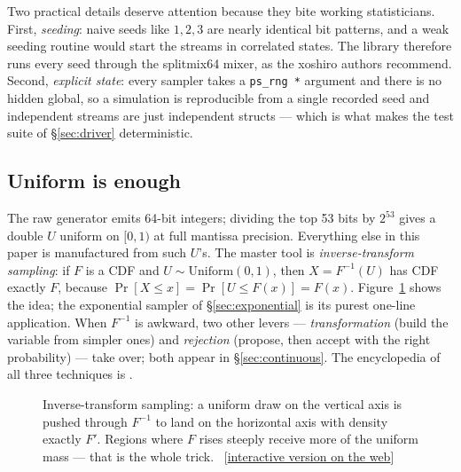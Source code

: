 \documentclass[11pt]{article}
\numberwithin{equation}{section}
\newcommand{\siteurl}{https://sanya-shopper.github.io/distribs/}
\newcommand{\webfig}[1]{{\small\sffamily\color{inkS}%
  [\href{\siteurl\##1}{interactive version on the web}]}}
\begin{document}
Two practical details deserve attention because they bite working
statisticians.  First, \emph{seeding}: naive seeds like $1, 2, 3$ are
nearly identical bit patterns, and a weak seeding routine would start the
streams in correlated states.  The library therefore runs every seed
through the splitmix64 mixer, as the xoshiro authors recommend.  Second,
\emph{explicit state}: every sampler takes a \texttt{ps\_rng~*} argument
and there is no hidden global, so a simulation is reproducible from a
single recorded seed and independent streams are just independent structs
--- which is what makes the test suite of \S\ref{sec:driver} deterministic.

\subsection{Uniform is enough}\label{sec:uniform-enough}

The raw generator emits 64-bit integers; dividing the top 53 bits by
$2^{53}$ gives a double $U$ uniform on $[0,1)$ at full mantissa precision.
Everything else in this paper is manufactured from such $U$'s.  The
master tool is \emph{inverse-transform sampling}: if $F$ is a CDF and
$U\sim\mathrm{Uniform}(0,1)$, then $X=F^{-1}(U)$ has CDF exactly $F$,
because $\Pr[X\le x]=\Pr[U\le F(x)]=F(x)$.  Figure~\ref{fig:inverse} shows
the idea; the exponential sampler of \S\ref{sec:exponential} is its
purest one-line application.  When $F^{-1}$ is awkward, two other levers
--- \emph{transformation} (build the variable from simpler ones) and
\emph{rejection} (propose, then accept with the right probability) ---
take over; both appear in \S\ref{sec:continuous}.  The encyclopedia of
all three techniques is \citet{devroye1986}.

\begin{figure}[htbp]
\centering
{}
\caption{Inverse-transform sampling: a uniform draw on the vertical axis is
pushed through $F^{-1}$ to land on the horizontal axis with density exactly
$F'$.  Regions where $F$ rises steeply receive more of the uniform mass ---
that is the whole trick.\ \webfig{uniform-bits}}
\label{fig:inverse}
\end{figure}
\end{document}
